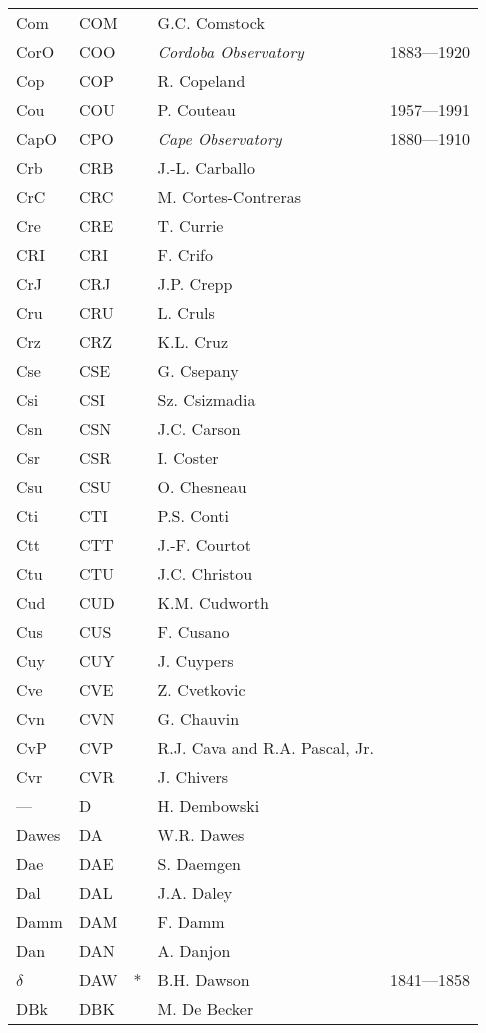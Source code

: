 \begin{longtable}{l|l|c|p{59mm}|l}
Com & COM &   & G.C. Comstock & \\
CorO & COO &   & \emph{Cordoba Observatory} & 1883---1920 \\
Cop & COP &   & R. Copeland & \\
Cou & COU &   & P. Couteau & 1957---1991 \\
CapO & CPO &   & \emph{Cape Observatory} & 1880---1910 \\
Crb & CRB &   & J.-L. Carballo & \\
CrC & CRC &   & M. Cortes-Contreras & \\
Cre & CRE &   & T. Currie & \\
CRI & CRI &   & F. Crifo & \\
CrJ & CRJ &   & J.P. Crepp & \\
Cru & CRU &   & L. Cruls & \\
Crz	& CRZ &   & K.L. Cruz & \\
Cse & CSE &   & G. Csepany & \\
Csi & CSI &   & Sz. Csizmadia & \\
Csn & CSN &   & J.C. Carson & \\
Csr & CSR &   & I. Coster & \\
Csu & CSU &   & O. Chesneau & \\
Cti & CTI &   & P.S. Conti & \\
Ctt & CTT &   & J.-F. Courtot & \\
Ctu & CTU &   & J.C. Christou & \\
Cud & CUD &   & K.M. Cudworth & \\
Cus & CUS &   & F. Cusano & \\
Cuy & CUY &   & J. Cuypers & \\
Cve & CVE &   & Z. Cvetkovic & \\
Cvn & CVN &   & G. Chauvin & \\
CvP & CVP &   & R.J. Cava and R.A. Pascal, Jr. & \\
Cvr & CVR &   & J. Chivers & \\\midrule
--- & D   &   & H. Dembowski & \\
Dawes & DA  &   & W.R. Dawes & \\
Dae & DAE &   & S. Daemgen & \\
Dal & DAL &   & J.A. Daley & \\
Damm & DAM &   & F. Damm & \\
Dan & DAN &   & A. Danjon & \\
$\delta$ & DAW & * & B.H. Dawson &1841---1858 \\
DBk & DBK &   & M. De Becker & \\

\end{longtable}

